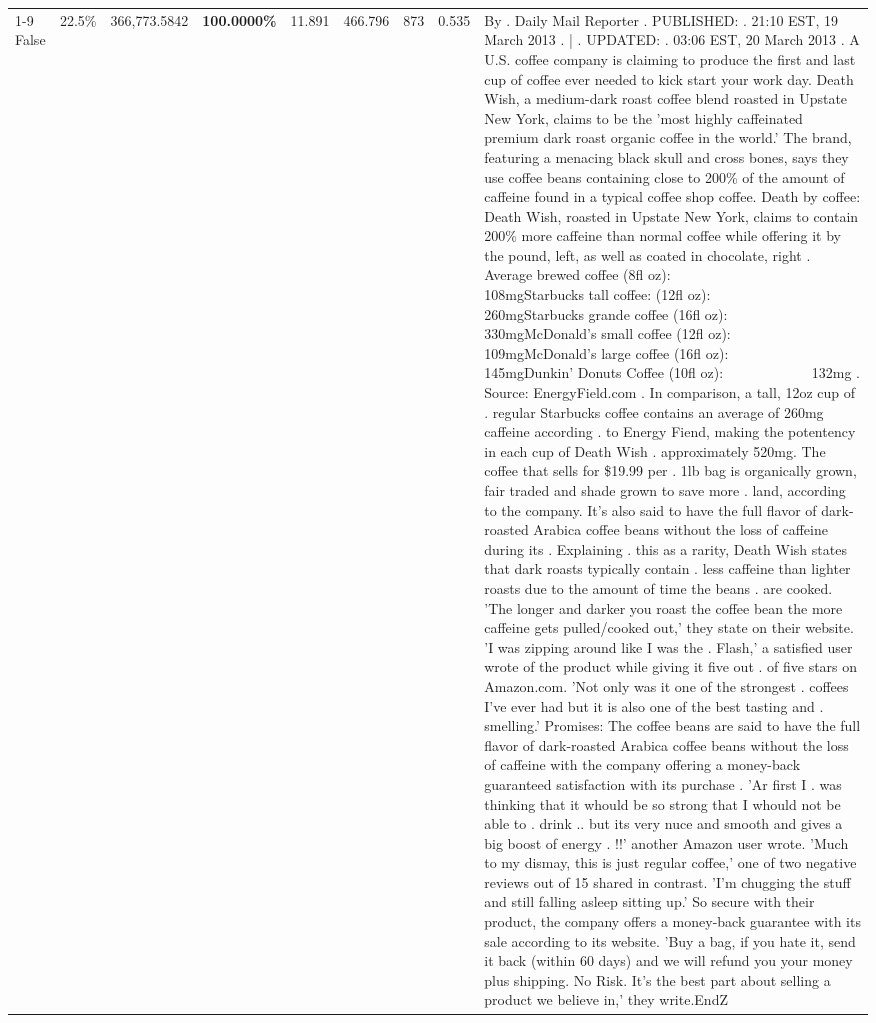 \begin{table}[H]
{\begin{tabular}{lllrlllll}
\cline{1-9}
False & 22.5\% & 366,773.5842 & \bfseries \color{red} 100.0000\% & 11.891 & 466.796 & 873 & 0.535 & By . Daily Mail Reporter . PUBLISHED: . 21:10 EST, 19 March 2013 . | . UPDATED: . 03:06 EST, 20 March 2013 . A U.S. coffee company is claiming to produce the first and last cup of coffee ever needed to kick start your work day. Death Wish, a medium-dark roast coffee blend roasted in Upstate New York, claims to be the 'most highly caffeinated premium dark roast organic coffee in the world.' The brand, featuring a menacing black skull and cross bones, says they use coffee beans containing close to 200\% of the amount of caffeine found in a typical coffee shop coffee. Death by coffee: Death Wish, roasted in Upstate New York, claims to contain 200\% more caffeine than normal coffee while offering it by the pound, left, as well as coated in chocolate, right . Average brewed coffee (8fl oz):              108mgStarbucks tall coffee: (12fl oz):                260mgStarbucks grande coffee (16fl oz):         330mgMcDonald's small coffee (12fl oz):           109mgMcDonald's large coffee (16fl oz):           145mgDunkin' Donuts Coffee (10fl oz):             132mg . Source: EnergyField.com . In comparison, a tall, 12oz cup of . regular Starbucks coffee contains an average of 260mg caffeine according . to Energy Fiend, making the potentency in each cup of Death Wish . approximately 520mg. The coffee that sells for \$19.99 per . 1lb bag is organically grown, fair traded and shade grown to save more . land, according to the company. It's also said to have the full flavor of dark-roasted Arabica coffee beans without the loss of caffeine during its . Explaining . this as a rarity, Death Wish states that dark roasts typically contain . less caffeine than lighter roasts due to the amount of time the beans . are cooked. 'The longer and darker you roast the coffee bean the more caffeine gets pulled/cooked out,' they state on their website. 'I was zipping around like I was the . Flash,' a satisfied user wrote of the product while giving it five out . of five stars on Amazon.com. 'Not only was it one of the strongest . coffees I've ever had but it is also one of the best tasting and . smelling.’ Promises: The coffee beans are said to have the full flavor of dark-roasted Arabica coffee beans without the loss of caffeine with the company offering a money-back guaranteed satisfaction with its purchase . 'Ar first I . was thinking that it whould be so strong that I whould not be able to . drink .. but its very nuce and smooth and gives a big boost of energy . !!' another Amazon user wrote. 'Much to my dismay, this is just regular coffee,' one of two negative reviews out of 15 shared in contrast. 'I'm chugging the stuff and still falling asleep sitting up.' So secure with their product, the company offers a money-back guarantee with its sale according to its website. 'Buy a bag, if you hate it, send it back (within 60 days) and we will refund you your money plus shipping. No Risk. It’s the best part about selling a product we believe in,' they write.EndZ \\

\end{tabular}}
\end{table}
